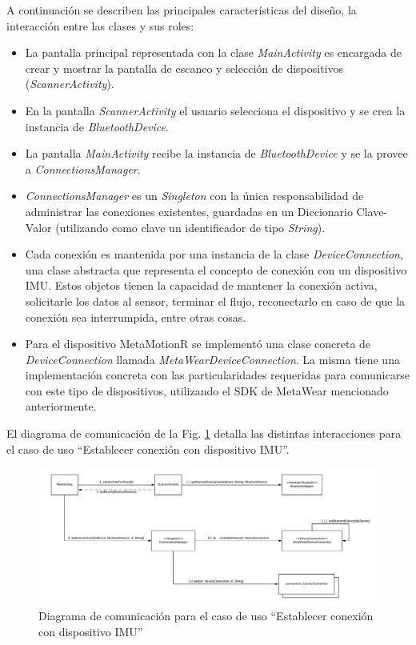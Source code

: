 A continuación se describen las principales características del diseño, la interacción entre las clases y sus roles: 

\begin{itemize}
    \item La pantalla principal representada con la clase \textit{MainActivity} es encargada de crear y mostrar la pantalla de escaneo y selección de dispositivos (\textit{ScannerActivity}).
    \item En la pantalla \textit{ScannerActivity} el usuario selecciona el dispositivo y se crea la instancia de \textit{BluetoothDevice}.
    \item La pantalla \textit{MainActivity} recibe la instancia de \textit{BluetoothDevice} y se la provee a \textit{ConnectionsManager}. 
    \item \textit{ConnectionsManager} es un \textit{Singleton} con la única responsabilidad de administrar las conexiones existentes, guardadas en un Diccionario Clave-Valor (utilizando como clave un identificador de tipo \textit{String}).
    \item Cada conexión es mantenida por una instancia de la clase \textit{DeviceConnection}, una clase abstracta que representa el concepto de conexión con un dispositivo IMU. Estos objetos tienen la capacidad de mantener la conexión activa, solicitarle los datos al sensor, terminar el flujo, reconectarlo en caso de que la conexión sea interrumpida, entre otras cosas. 
    \item Para el dispositivo MetaMotionR se implementó una clase concreta de \textit{DeviceConnection} llamada \textit{MetaWearDeviceConnection}. La misma tiene una implementación concreta con las particularidades requeridas para comunicarse con este tipo de dispositivos, utilizando el SDK de MetaWear mencionado anteriormente.
\end{itemize}

El diagrama de comunicación de la Fig. \ref{FIG:addconnection-comm-diagram} detalla las distintas interacciones para el caso de uso ``Establecer conexión con dispositivo IMU''. 

\newpage

\begin{figure}[H]
    \hspace*{-3.0cm}%
    \includegraphics[clip,width=1.4 \columnwidth]{TESIS/imagenes/chap05/CreateConnection-CommDiagram.png}
    \caption{Diagrama de comunicación para el caso de uso ``Establecer conexión con dispositivo IMU''}
    \label{FIG:addconnection-comm-diagram}
\end{figure}

